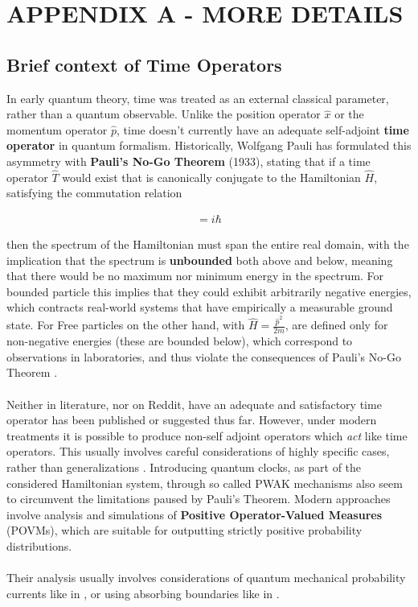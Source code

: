 \section{APPENDIX A - MORE DETAILS}

\subsection{Brief context of Time Operators}
\label{ap:time_context}

In early quantum theory, time was treated as an external classical parameter, rather than a quantum observable. Unlike the position operator $\hat{x}$ or the momentum operator $\hat{p}$, time doesn't currently have an adequate self-adjoint \textbf{time operator} in quantum formalism. Historically, Wolfgang Pauli has formulated this asymmetry with \textbf{Pauli's No-Go Theorem} (1933), stating that if a time operator $\hat{T}$ would exist that is canonically conjugate to the Hamiltonian $\hat{H}$, satisfying the commutation relation

\begin{align}
    [\hat{T}, \hat{H}] = i\hbar
\end{align}

then the spectrum of the Hamiltonian must span the entire real domain, with the implication that the spectrum is \textbf{unbounded} both above and below, meaning that there would be no maximum nor minimum energy in the spectrum. For bounded particle this implies that they could exhibit arbitrarily negative energies, which contracts real-world systems that have empirically a measurable ground state. For Free particles on the other hand, with $\hat{H}=\frac{\hat{p}^2}{2m}$, are defined only for non-negative energies (these are bounded below), which correspond to observations in laboratories, and thus violate the consequences of Pauli's No-Go Theorem \cite{book:wolfgangpauli} \cite{paper:paulitheorem}.
\\\\
Neither in literature, nor on Reddit, have an adequate and satisfactory time operator has been published or suggested thus far. However, under modern treatments it is possible to produce non-self adjoint operators which \textit{act} like time operators. This usually involves careful considerations of highly specific cases, rather than generalizations \cite{paper:paulitheorem}. Introducing quantum clocks, as part of the considered Hamiltonian system, through so called PWAK mechanisms \cite{paper:quantumclocks} also seem to circumvent the limitations paused by Pauli's Theorem. Modern approaches involve analysis and simulations of \textbf{Positive Operator-Valued Measures} (POVMs), which are suitable for outputting strictly positive probability distributions.
\\\\
Their analysis usually involves considerations of quantum mechanical probability currents like in \cite{paper:probability_current}, or using absorbing boundaries like in \cite{paper:tumulka}.

